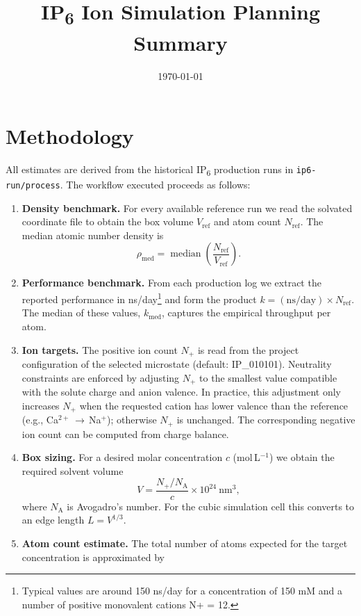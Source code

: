 \documentclass[a4paper,11pt]{article}
\title{IP\textsubscript{6} Ion Simulation Planning Summary}
\author{}
\date{\today}
\begin{document}
\maketitle

\section{Methodology}
All estimates are derived from the historical IP\textsubscript{6} production runs in \texttt{ip6-run/process}. The workflow executed proceeds as follows:
\begin{enumerate}
    \item \textbf{Density benchmark.} For every available reference run we read the solvated coordinate file to obtain the box volume $V_{\mathrm{ref}}$ and atom count $N_{\mathrm{ref}}$. The median atomic number density is
    \begin{equation}
        \rho_{\mathrm{med}} = \operatorname{median}\left(\frac{N_{\mathrm{ref}}}{V_{\mathrm{ref}}}\right).
    \end{equation}
    \item \textbf{Performance benchmark.} From each production log we extract the reported performance in ns/day\footnote{Typical values are around 150 ns/day for a concentration of 150 mM and a number of positive monovalent cations N+ = 12.} and form the product $k = (\mathrm{ns/day}) \times N_{\mathrm{ref}}$. The median of these values, $k_{\mathrm{med}}$, captures the empirical throughput per atom.
    \item \textbf{Ion targets.} The positive ion count $N_+$ is read from the project configuration of the selected microstate (default: IP\_010101). Neutrality constraints are enforced by adjusting $N_+$ to the smallest value compatible with the solute charge and anion valence. In practice, this adjustment only increases $N_+$ when the requested cation has lower valence than the reference (e.g., Ca$^{2+}$\,$\to$\,Na$^+$); otherwise $N_+$ is unchanged. The corresponding negative ion count can be computed from charge balance.
    \item \textbf{Box sizing.} For a desired molar concentration $c$ (mol\,L$^{-1}$) we obtain the required solvent volume
    \begin{equation}
        V = \frac{N_+ / N_{\mathrm{A}}}{c} \times 10^{24}\ \text{nm}^3,
    \end{equation}
    where $N_{\mathrm{A}}$ is Avogadro's number. For the cubic simulation cell this converts to an edge length $L = V^{1/3}$.
    \item \textbf{Atom count estimate.} The total number of atoms expected for the target concentration is approximated by

\end{enumerate}
\end{document}
